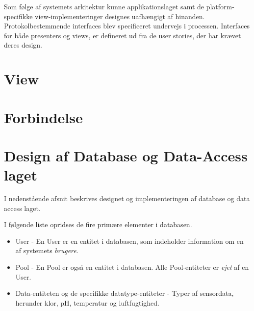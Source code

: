 Som følge af systemets arkitektur kunne applikationslaget samt de platform-specifikke view-implementeringer
designes uafhængigt af hinanden. Protokolbestemmende interfaces blev specificeret undervejs i processen. Interfaces for både presenters og views, er defineret ud fra de user stories, der har krævet deres design.



\section{View}







\section{Forbindelse}



\section{Design af Database og Data-Access laget}\label{sec:designdatabase}
I nedenstående afsnit beskrives designet og implementeringen af database og data access laget.

I følgende liste opridses de fire primære elementer i databasen.

\begin{itemize}
	\item User - En User er en entitet i databasen, som indeholder information om en af systemets \textit{brugere}.
	\item Pool - En Pool er også en entitet i databasen. Alle Pool-entiteter er \textit{ejet} af en User.
	\item Data-entiteten og de specifikke datatype-entiteter - Typer af sensordata, herunder klor, pH, temperatur og luftfugtighed.
\end{itemize}


